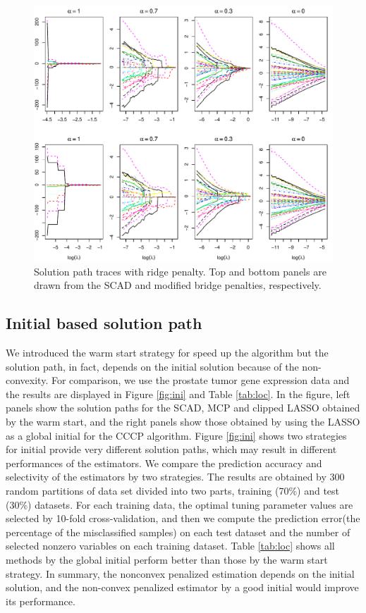 \begin{figure}[htbp]
  \centering
  \includegraphics[width=\linewidth]{ridge-eff}
  \caption{Solution path traces with ridge penalty. Top and bottom panels are drawn from the SCAD and modified bridge penalties, respectively.}
  \label{fig:ridge}
\end{figure}

\subsection{Initial based solution path}
We introduced the warm start strategy for speed up the algorithm
but the solution path, in fact, depends on the initial solution because of the non-convexity.
For comparison, we use the prostate tumor gene expression data and the results are displayed in Figure \ref{fig:ini} and Table \ref{tab:loc}.
In the figure, left panels show the solution paths for the SCAD, MCP and clipped LASSO obtained by the warm start,
and the right panels show those obtained by using the LASSO as a global initial for the CCCP algorithm.
Figure \ref{fig:ini} shows two strategies for initial provide very different solution paths, which may result in different performances of the estimators.
We compare the prediction accuracy and selectivity of the estimators by two strategies.
The results are obtained by 300 random partitions of data set divided into two parts, training (70\%) and test (30\%) datasets.
For each training data, the optimal tuning parameter values are selected by 10-fold cross-validation,
and then we compute the prediction error(the percentage of the misclassified samples) on each test dataset and the number of selected nonzero variables on each training dataset.
Table \ref{tab:loc} shows all methods by the global initial perform better than those by the warm start strategy.
In summary, the nonconvex penalized estimation depends on the initial solution,
and the non-convex penalized estimator by a good initial would improve its performance.


